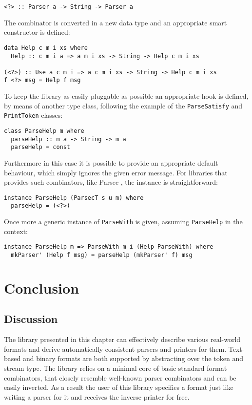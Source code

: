 \documentclass[../Thesis.tex]{subfiles}
\begin{document}
\begin{verbatim}
<?> :: Parser a -> String -> Parser a
\end{verbatim}	

	The combinator is converted in a new data type and
	an appropriate smart constructor is defined:
\begin{verbatim}
data Help c m i xs where
  Help :: c m i a => a m i xs -> String -> Help c m i xs

(<?>) :: Use a c m i => a c m i xs -> String -> Help c m i xs
f <?> msg = Help f msg
\end{verbatim}
	
	To keep the library as easily pluggable as possible an appropriate
	hook is defined, by means of another type class, following the
	example of the \texttt{ParseSatisfy} and \texttt{PrintToken} classes:

\begin{verbatim}
class ParseHelp m where
  parseHelp :: m a -> String -> m a
  parseHelp = const
\end{verbatim}
	Furthermore in this case it is possible to provide an appropriate
	default behaviour, which simply ignores the given error message.
	For libraries that provides such combinators, like Parsec \cite{Parsec},
	the instance is straightforward:
	
\begin{verbatim}
instance ParseHelp (ParsecT s u m) where
  parseHelp = (<?>)
\end{verbatim}

	Once more a generic instance of \texttt{ParseWith} is given,
	assuming \texttt{ParseHelp} in the context:
	
\begin{verbatim}
instance ParseHelp m => ParseWith m i (Help ParseWith) where
  mkParser' (Help f msg) = parseHelp (mkParser' f) msg
\end{verbatim}
	
\section{Conclusion}
\label{sec:FormatConclusion}
\subsection{Discussion}
\label{subsec:Discussion}
The library presented in this chapter can effectively describe various real-world formats and derive automatically consistent parsers and printers 
for them.
Text-based and binary formats are both supported by abstracting
over the token and stream type.
The library relies on a minimal core of basic standard format combinators, that closely resemble well-known parser combinators and can be easily
inverted.
As a result the user of this library specifies a format just like writing a parser for it and receives the inverse printer for free.
\end{document}
